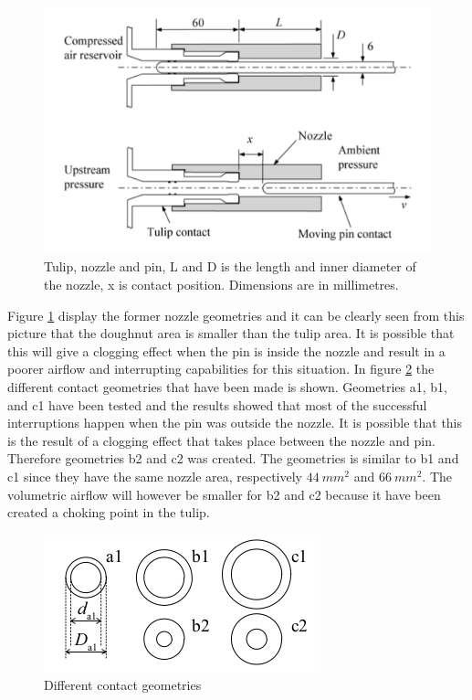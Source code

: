 \documentclass[10pt,a4paper]{article}
\begin{document}
\begin{figure} [h]
\centering
\includegraphics[scale=0.5]{Bilder/Theory/SchematicTestSwitch.png}
\caption{Tulip, nozzle and pin, L and D is the length and inner diameter of the nozzle, x is contact position. Dimensions are in millimetres.   \cite{bib:CIAMVLBS}} \label{fig:SchematicTestSwitch}
\end{figure}

Figure \ref{fig:SchematicTestSwitch} display the former nozzle geometries and it can be clearly seen from this picture that the doughnut area is smaller than the tulip area. It is possible that this will give a clogging effect when the pin is inside the nozzle and result in a poorer airflow and interrupting capabilities for this situation. In figure \ref{fig:differentGeometries} the different contact geometries that have been made is shown. Geometries a1, b1, and c1 have been tested and the results showed that most of the successful interruptions happen when the pin was outside the nozzle. It is possible that this is the result of a clogging effect that takes place between the nozzle and pin. Therefore geometries b2 and c2 was created. The geometries is similar to b1 and c1 since they have the same nozzle area, respectively $44 \ mm^2$ and $66 \ mm^2$. The volumetric airflow will however be smaller for b2 and c2 because it have been created a choking point in the tulip. 

\begin{figure} [h]
\centering
\includegraphics[scale=0.6]{Bilder/Theory/differentGeometries.png}
\caption{Different contact geometries \cite{bib:CIAMVLBS}} \label{fig:differentGeometries}
\end{figure}
\end{document}
